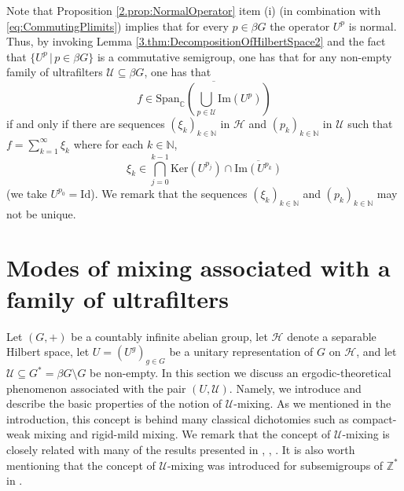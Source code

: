 \documentclass[graybox]{svmult}
\theoremstyle{definition}
\newcommand{\N}{\mathbb{N}}
\newcommand{\Z}{\mathbb{Z}}
\begin{document}
\begin{remark}
    Note that Proposition \ref{2.prop:NormalOperator} item (i) (in combination with \eqref{eq:CommutingPlimits}) implies that for every $p\in\beta G$ the operator $U^p$ is normal. Thus, by invoking Lemma \ref{3.thm:DecompositionOfHilbertSpace2} and the fact that $\{U^p\,|\,p\in\beta G\}$ is a commutative semigroup, one has that for any non-empty family of ultrafilters $\mathcal U\subseteq \beta G$, one has that 
    $$f\in \overline{\text{Span}_{\mathbb C}\left(\bigcup_{p\in\mathcal U}\text{Im}(U^p)\right)}$$
    if and only if there are sequences $(\xi_k)_{k\in\N}$ in $\mathcal H$ and $(p_k)_{k\in\N}$ in $\mathcal U$ such that $f=\sum_{k=1}^\infty\xi_k$ where for  each $k\in\N$, 
    $$\xi_k\in \bigcap_{j=0}^{k-1}\text{Ker}(U^{p_j})\cap\overline{\text{Im}(U^{p_k}) }$$
     (we take $U^{p_0}=\text{Id}$). We remark that the sequences $(\xi_k)_{k\in\N}$ and $(p_k)_{k\in\N}$ may not be unique. 
\end{remark}
\section{Modes of mixing  associated with a family of ultrafilters}\label{sec:SpectralMixing}
Let $(G,+)$ be a countably infinite abelian group, let $\mathcal H$ denote a separable Hilbert space, let $U=(U^g)_{g\in G}$ be a unitary representation of $G$ on $\mathcal H$, and let $\mathcal U\subseteq G^*=\beta G\setminus G$ be non-empty. In this section we discuss an ergodic-theoretical phenomenon associated with the pair $(U,\mathcal U)$. Namely, we introduce and describe the basic properties of the notion of $\mathcal U$-mixing. As we mentioned in the introduction, this concept is behind many classical dichotomies such as compact-weak mixing and rigid-mild mixing. We remark that the concept of $\mathcal U$-mixing is closely related with many of the results presented in 
\cite{MixingViaFatIntersections}, \cite{KuangYeMixingViaFamilies}, \cite{AlmostMixingOfAllOrders}. It is also worth mentioning that the concept of $\mathcal U$-mixing was introduced for subsemigroups of $\Z^*$ in \cite{StronglyMixingPET}.
\end{document}
